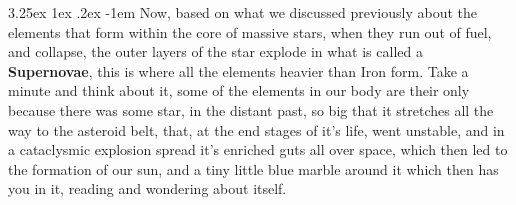 \documentclass[a4paper,twoside,11pt]{article}
\makeatletter
\numberwithin{equation}{section}
\renewcommand\paragraph{\@startsection{paragraph}{5}{\z@}%
  {3.25ex \@plus1ex \@minus.2ex}%
  {-1em}%
  {\normalfont\normalsize\bfseries}}
\makeatother
\begin{document}
\paragraph{}
Now, based on what we discussed previously about the elements that form within the core of massive stars, when they run out of fuel, and collapse, the outer layers of the star explode in what is called a \textbf{Supernovae}, this is where all the elements heavier than Iron form. Take a minute and think about it, some of the elements in our body are their only because there was some star, in the distant past, so big that it stretches all the way to the asteroid belt, that, at the end stages of it's life, went unstable, and in a cataclysmic explosion spread it's enriched guts all over space, which then led to the formation of our sun, and a tiny little blue marble around it which then has you in it, reading and wondering about itself.
\end{document}
